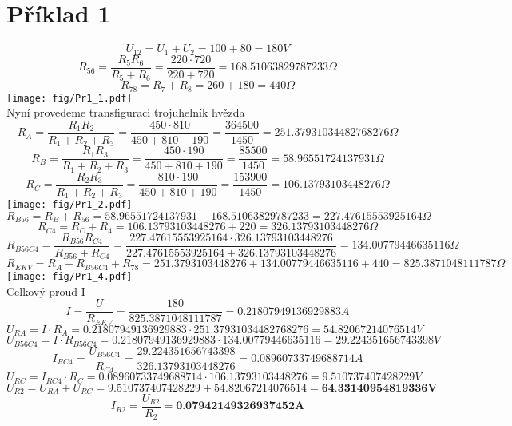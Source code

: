 \section{Příklad 1}
\[
  U_{12} = U_{1} + U_{2} = 100 + 80 = 180V
\]
\[
  R_{56} = \displaystyle\frac{R_{5}R_{6}}{R_{5}+R_{6}}  = \displaystyle\frac{220 \cdot 720}{220 + 720} = 168.51063829787233 \Omega
\]
\[
  R_{78} = R_{7} + R_{8} = 260 + 180 = 440\Omega
\]
\texttt{[image: fig/Pr1\_1.pdf]}\\
Nyní provedeme transfiguraci  trojuhelník hvězda
\[
  R_{A} = \displaystyle\frac{R_{1}R_{2}}{R_{1}+R_{2}+R_{3}}
  = \displaystyle\frac{450 \cdot 810}{450 + 810 + 190}
  = \displaystyle\frac{364500}{1450}
  = 251.37931034482768276 \Omega
\]
\[
  R_{B} = \displaystyle\frac{R_{1}R_{3}}{R_{1}+R_{2}+R_{3}}
  = \displaystyle\frac{450 \cdot 190}{450 + 810 + 190}
  = \displaystyle\frac{85500}{1450}
  = 58.96551724137931 \Omega
\]
\[
  R_{C} = \displaystyle\frac{R_{2}R_{3}}{R_{1}+R_{2}+R_{3}}
  = \displaystyle\frac{810 \cdot 190}{450 + 810 + 190}
  = \displaystyle\frac{153900}{1450}
  = 106.13793103448276 \Omega
\]
\texttt{[image: fig/Pr1\_2.pdf]}
\[
  R_{B56} = R_{B} + R_{56} = 58.96551724137931 + 168.51063829787233 = 227.47615553925164 \Omega
\]
\[
  R_{C4} = R_{C} + R_{4} = 106.13793103448276 + 220 = 326.13793103448276 \Omega
\]
\[
  R_{B56C4} = \displaystyle\frac{R_{B56}R_{C4}}{R_{B56}+R_{C4}}
  = \displaystyle\frac{227.47615553925164 \cdot  326.13793103448276}{227.47615553925164 + 326.13793103448276}
  = 134.00779446635116 \Omega
\]
\[
  R_{EKV} = R_{A} + R_{B56C4} + R_{78} = 251.3793103448276 + 134.00779446635116 + 440
  = 825.3871048111787 \Omega
\]
\texttt{[image: fig/Pr1\_4.pdf]}\\
Celkový proud I
\[
  I = \displaystyle\frac{U}{R_{EKV}} = \displaystyle\frac{180}{825.3871048111787} = 0.21807949136929883A
\]
\[
  U_{RA} = I \cdot R_A
  = 0.21807949136929883 \cdot 251.37931034482768276
  = 54.82067214076514V
\]
\[
  U_{B56C4} = I \cdot R_{B56C4}
 = 0.21807949136929883 \cdot 134.00779446635116
 = 29.224351656743398V
\]
\[
  I_{RC4} = \displaystyle\frac{U_{B56C4}}{R_{C4}} 
 = \displaystyle\frac{29.224351656743398}{326.13793103448276}
 = 0.08960733749688714 A
\] 
\[
  U_{RC} = I_{RC4} \cdot R_C
  = 0.08960733749688714  \cdot 106.13793103448276
  = 9.510737407428229 V
\]
\[
  U_{R2} = U_{RA} + U_{RC}
  = 9.510737407428229+54.82067214076514
  = \textbf{64.33140954819336V}
\]
\[
  I_{R2} = \displaystyle\frac{U_{R2}}{R_2}
  = \textbf{0.07942149326937452A}
\]

